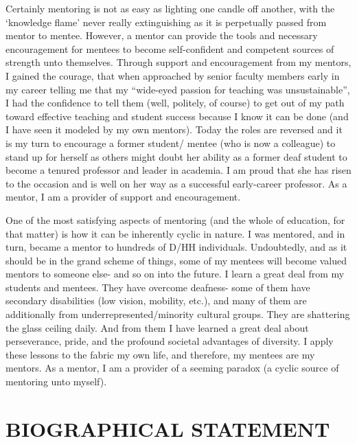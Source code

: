 \documentclass[11.5pt]{sig-alternate} %
\begin{document}
\begin{large}
Certainly mentoring is not as easy as lighting one candle off another, with the ‘knowledge flame’ never really extinguishing as it is perpetually passed from mentor to mentee. However, a mentor can provide the tools and necessary encouragement for mentees to become self-confident and competent sources of strength unto themselves. Through support and encouragement from my mentors, I gained the courage, that when approached by senior faculty members early in my career telling me that my “wide-eyed passion for teaching was unsustainable”, I had the confidence to tell them (well, politely, of course) to get out of my path toward effective teaching and student success because I know it can be done (and I have seen it modeled by my own mentors). Today the roles are reversed and it is my turn to encourage a former student/ mentee (who is now a colleague) to stand up for herself as others might doubt her ability as a former deaf student to become a tenured professor and leader in academia. I am proud that she has risen to the occasion and is well on her way as a successful early-career professor. As a mentor, I am a provider of support and encouragement.

One of the most satisfying aspects of mentoring (and the whole of education, for that matter) is how it can be inherently cyclic in nature. I was mentored, and in turn, became a mentor to hundreds of D/HH individuals. Undoubtedly, and as it should be in the grand scheme of things, some of my mentees will become valued mentors to someone else- and so on into the future. I learn a great deal from my students and mentees. They have overcome deafness- some of them have secondary disabilities (low vision, mobility, etc.), and many of them are additionally from underrepresented/minority cultural groups. They are shattering the glass ceiling daily. And from them I have learned a great deal about perseverance, pride, and the profound societal advantages of diversity. I apply these lessons to the fabric my own life, and therefore, my mentees are my mentors. As a mentor, I am a provider of a seeming paradox (a cyclic source of mentoring unto myself).

\section*{BIOGRAPHICAL STATEMENT}


\end{large}
\end{document}
